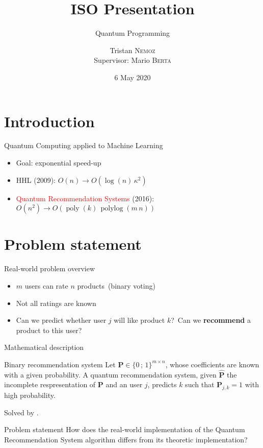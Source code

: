 \documentclass{beamer}
\title{ISO Presentation}
\subtitle{Quantum Programming}
\date{6 May 2020}
\author[Tristan \textsc{Nemoz}]{Tristan \textsc{Nemoz}\\{\small Supervisor: Mario \textsc{Berta}}}
\DeclareMathOperator{\polylog}{polylog}
\DeclareMathOperator{\poly}{poly}
\begin{document}
\begin{frame}
\maketitle
\end{frame}

\section{Introduction}

\begin{frame}{Quantum Computing applied to Machine Learning}
    \begin{itemize}
        \item Goal: exponential speed-up\pause
        \item HHL (2009): $O(n)\to O\left(\log(n)\,\kappa^2\right)$\pause
        \item \textcolor<4->{red}{Quantum Recommendation Systems} (2016): $O\left(n^2\right)\to O(\poly(k)\,\polylog(m\,n))$
    \end{itemize}
\end{frame}

\section{Problem statement}

\begin{frame}{Real-world problem overview}
    \begin{itemize}
        \item $m$ users can rate $n$ products\pause\ (binary voting)\pause
        \item Not all ratings are known\pause
        \item Can we predict whether user $j$ will like product $k$?\pause\ Can we \textbf{recommend} a product to this user?
    \end{itemize}
\end{frame}

\begin{frame}{Mathematical description}
    \begin{block}{Binary recommendation system}
        Let $\mathbf{P}\in\{0\,;\,1\}^{m\times n}$, whose coefficients are known with a given probability. A quantum recommendation system, given $\hat{\mathbf{P}}$ the incomplete respresentation of $\mathbf{P}$ and an user $j$, predicts $k$ such that $\mathbf{P}_{j,k}=1$ with high probability.
    \end{block}\pause
    Solved by \citeauthor{QRS}.\pause\pause
    
    \begin{block}{Problem statement}
        How does the real-world implementation of the Quantum Recommendation System algorithm differs from its theoretic implementation?
    \end{block}
\end{frame}
\end{document}
